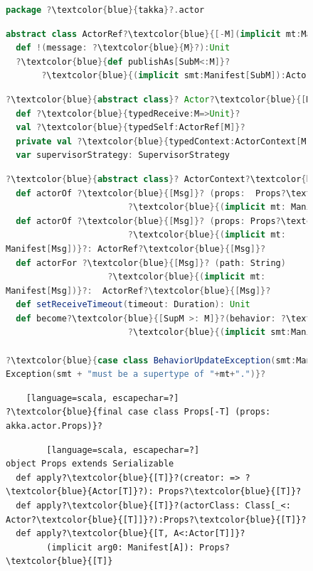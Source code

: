 \begin{figure}[!h]
\label{takka_api}
    \begin{lstlisting}[language=scala, escapechar=?]
package ?\textcolor{blue}{takka}?.actor   
\end{lstlisting}

    \begin{lstlisting}[language=scala, escapechar=?]
abstract class ActorRef?\textcolor{blue}{[-M](implicit mt:Manifest[M])}?
  def !(message: ?\textcolor{blue}{M}?):Unit
  ?\textcolor{blue}{def publishAs[SubM<:M]}?
       ?\textcolor{blue}{(implicit smt:Manifest[SubM]):ActorRef[SubM]}?
    \end{lstlisting}
    
    \begin{lstlisting}[language=scala, escapechar=?]
?\textcolor{blue}{abstract class}? Actor?\textcolor{blue}{[M:Manifest]}?  extends  akka.actor.Actor
  def ?\textcolor{blue}{typedReceive:M=>Unit}?
  val ?\textcolor{blue}{typedSelf:ActorRef[M]}?
  private val ?\textcolor{blue}{typedContext:ActorContext[M]}?
  var supervisorStrategy: SupervisorStrategy
\end{lstlisting}

      \begin{lstlisting}[language=scala, escapechar=?]
?\textcolor{blue}{abstract class}? ActorContext?\textcolor{blue}{[M:Manifest]}?
  def actorOf ?\textcolor{blue}{[Msg]}? (props:  Props?\textcolor{blue}{[Msg])}?
  						?\textcolor{blue}{(implicit mt: Manifest[Msg]}?): ActorRef?\textcolor{blue}{[Msg]}?
  def actorOf ?\textcolor{blue}{[Msg]}? (props: Props?\textcolor{blue}{[Msg]}?, name: String)
  						?\textcolor{blue}{(implicit mt: 
Manifest[Msg])}?: ActorRef?\textcolor{blue}{[Msg]}?
  def actorFor ?\textcolor{blue}{[Msg]}? (path: String)
       				?\textcolor{blue}{(implicit mt: 
Manifest[Msg])}?:  ActorRef?\textcolor{blue}{[Msg]}?
  def setReceiveTimeout(timeout: Duration): Unit
  def become?\textcolor{blue}{[SupM >: M]}?(behavior: ?\textcolor{blue}{SupM=>Unit}?)
						?\textcolor{blue}{(implicit smt:Manifest[SupM]):ActorRef[SupM]}?

?\textcolor{blue}{case class BehaviorUpdateException(smt:Manifest[\_],  mt:Manifest[\_]) extends \ 
Exception(smt + "must be a supertype of "+mt+".")}?
    \end{lstlisting}
    
    \begin{lstlisting}    [language=scala, escapechar=?]
?\textcolor{blue}{final case class Props[-T] (props: akka.actor.Props)}?
    \end{lstlisting}
    \begin{lstlisting}        [language=scala, escapechar=?]
object Props extends Serializable
  def apply?\textcolor{blue}{[T]}?(creator: => ?\textcolor{blue}{Actor[T]}?): Props?\textcolor{blue}{[T]}?
  def apply?\textcolor{blue}{[T]}?(actorClass: Class[_<: Actor?\textcolor{blue}{[T]]}?):Props?\textcolor{blue}{[T]}?
  def apply?\textcolor{blue}{[T, A<:Actor[T]]}? 
  		(implicit arg0: Manifest[A]): Props?\textcolor{blue}{[T]}
    \end{lstlisting}
    

\end{figure}
